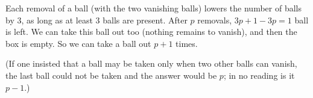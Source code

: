 Each removal of a ball (with the two vanishing balls) lowers the number of balls by $3$, as long as at least $3$ balls are present. After $p$ removals, $3p+1-3p=1$ ball is left. We can take this ball out too (nothing remains to vanish), and then the box is empty. So we can take a ball out $\boxed{p+1}$ times.

(If one insisted that a ball may be taken only when two other balls can vanish, the last ball could not be taken and the answer would be $p$; in no reading is it $p-1$.)

